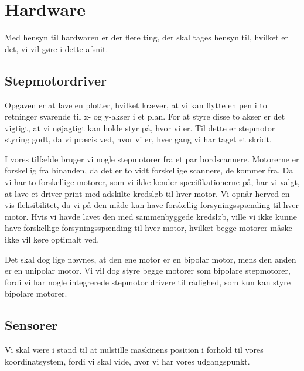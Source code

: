 \chapter[Design af hardware]{Hardware}
\label{ch:d-hardware}


Med hensyn til hardwaren er der flere ting, der skal tages hensyn
til, hvilket er det, vi vil gøre i dette afsnit.


\section{Stepmotordriver}

Opgaven er at lave en plotter, hvilket kræver, at vi kan flytte en pen
i to retninger svarende til x- og y-akser i et plan. For at styre
disse to akser er det vigtigt, at vi nøjagtigt kan holde styr på, hvor vi
er. Til dette er stepmotor styring godt, da vi præcis ved, hvor vi er,
hver gang vi har taget et skridt.

I vores tilfælde bruger vi nogle stepmotorer fra et par
bordscannere. Motorerne er forskellig fra hinanden, da det er to vidt
forskellige scannere, de kommer fra. Da vi har to forskellige motorer,
som vi ikke kender specifikationerne på, har vi valgt, at lave et
driver print med adskilte kredsløb til hver motor. Vi opnår herved en
vis fleksibilitet, da vi på den måde kan have forskellig
forsyningsspænding til hver motor. Hvis vi havde lavet den med
sammenbyggede kredsløb, ville vi ikke kunne have forskellige
forsyningsspænding til hver motor, hvilket begge motorer måske ikke
vil køre optimalt ved.

Det skal dog lige nævnes, at den ene motor er en bipolar motor, mens
den anden er en unipolar motor. Vi vil dog styre begge motorer som
bipolare stepmotorer, fordi vi har nogle integrerede stepmotor
drivere til rådighed, som kun kan styre bipolare motorer.


\section{Sensorer}

Vi skal være i stand til at nulstille maskinens position i forhold til
vores koordinatsystem, fordi vi skal vide, hvor vi har vores
udgangspunkt.

